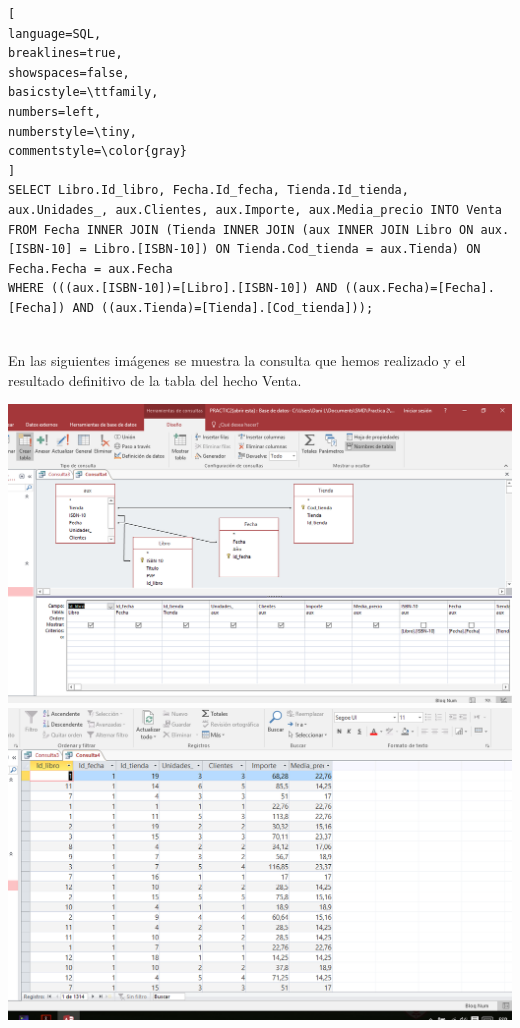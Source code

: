 \documentclass[paper=a4, fontsize=11pt, spanish]{scrartcl}
\numberwithin{equation}{section} %
\numberwithin{figure}{section} %
\numberwithin{table}{section} %
\begin{document}
\begin{lstlisting}[
language=SQL,
breaklines=true,
showspaces=false,
basicstyle=\ttfamily,
numbers=left,
numberstyle=\tiny,
commentstyle=\color{gray}
]
SELECT Libro.Id_libro, Fecha.Id_fecha, Tienda.Id_tienda, aux.Unidades_, aux.Clientes, aux.Importe, aux.Media_precio INTO Venta
FROM Fecha INNER JOIN (Tienda INNER JOIN (aux INNER JOIN Libro ON aux.[ISBN-10] = Libro.[ISBN-10]) ON Tienda.Cod_tienda = aux.Tienda) ON Fecha.Fecha = aux.Fecha
WHERE (((aux.[ISBN-10])=[Libro].[ISBN-10]) AND ((aux.Fecha)=[Fecha].[Fecha]) AND ((aux.Tienda)=[Tienda].[Cod_tienda]));


\end{lstlisting}
En las siguientes imágenes se muestra la consulta que hemos realizado y el resultado definitivo de la tabla del hecho Venta.
\begin{center}
	\includegraphics[scale=0.35]{id1.png}
	\includegraphics[scale=0.35]{id2.png}
\end{center}
\end{document}
